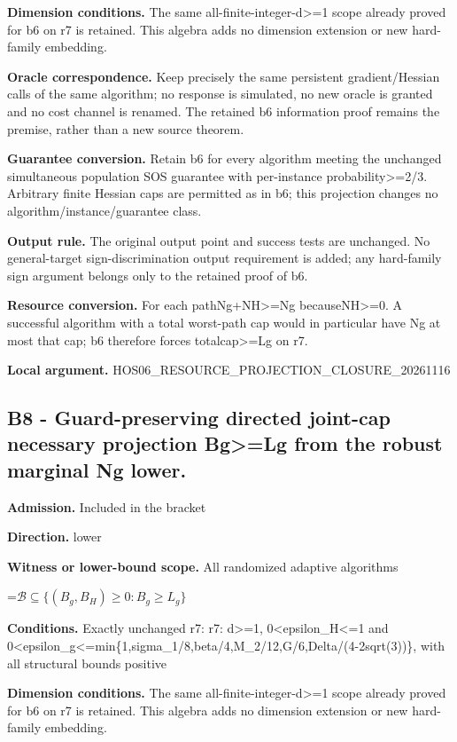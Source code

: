 \documentclass[10pt,a4paper]{article}
\newcommand{\AtlasMath}[1]{\par\begingroup\centering\setbox0=\hbox{$\displaystyle #1$}\ifdim\wd0>1.4\linewidth\typeout{ATLAS WIDE FORMULA: \the\wd0}\fi\ifdim\wd0>\linewidth\resizebox{\linewidth}{!}{\box0}\else\box0\fi\par\endgroup}
\begin{document}
\textbf{Dimension conditions.} The same all-finite-integer-d>=1 scope already proved for b6 on r7 is retained. This algebra adds no dimension extension or new hard-family embedding.

\textbf{Oracle correspondence.} Keep precisely the same persistent gradient/Hessian calls of the same algorithm; no response is simulated, no new oracle is granted and no cost channel is renamed. The retained b6 information proof remains the premise, rather than a new source theorem.

\textbf{Guarantee conversion.} Retain b6 for every algorithm meeting the unchanged simultaneous population SOS guarantee with per-instance probability>=2/3. Arbitrary finite Hessian caps are permitted as in b6; this projection changes no algorithm/instance/guarantee class.

\textbf{Output rule.} The original output point and success tests are unchanged. No general-target sign-discrimination output requirement is added; any hard-family sign argument belongs only to the retained proof of b6.

\textbf{Resource conversion.} For each pathNg+NH>=Ng becauseNH>=0. A successful algorithm with a total worst-path cap would in particular have Ng at most that cap; b6 therefore forces totalcap>=Lg on r7.

\textbf{Local argument.} HOS06\_\allowbreak{}RESOURCE\_\allowbreak{}PROJECTION\_\allowbreak{}CLOSURE\_\allowbreak{}20261116

\subsection{B8 - Guard-preserving directed joint-cap necessary projection Bg>=Lg from the robust marginal Ng lower.}
\textbf{Admission.} Included in the bracket

\textbf{Direction.} lower

\textbf{Witness or lower-bound scope.} All randomized adaptive algorithms

\AtlasMath{\mathcal B\subseteq\{(B_g,B_H)\ge0:B_g\ge L_g\}}
\textbf{Conditions.} Exactly unchanged r7: r7: d>=1, 0<epsilon\_\allowbreak{}H<=1 and 0<epsilon\_\allowbreak{}g<=min\{1,sigma\_\allowbreak{}1/8,beta/4,M\_\allowbreak{}2/12,G/6,Delta/(4-2sqrt(3))\}, with all structural bounds positive

\textbf{Dimension conditions.} The same all-finite-integer-d>=1 scope already proved for b6 on r7 is retained. This algebra adds no dimension extension or new hard-family embedding.
\end{document}

